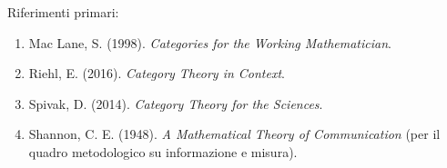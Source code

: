 Riferimenti primari:

\begin{enumerate}
\def\labelenumi{\arabic{enumi}.}
\tightlist
\item
  Mac Lane, S. (1998). \emph{Categories for the Working Mathematician}.
\item
  Riehl, E. (2016). \emph{Category Theory in Context}.
\item
  Spivak, D. (2014). \emph{Category Theory for the Sciences}.
\item
  Shannon, C. E. (1948). \emph{A Mathematical Theory of Communication} (per il quadro metodologico su informazione e misura).
\end{enumerate}
